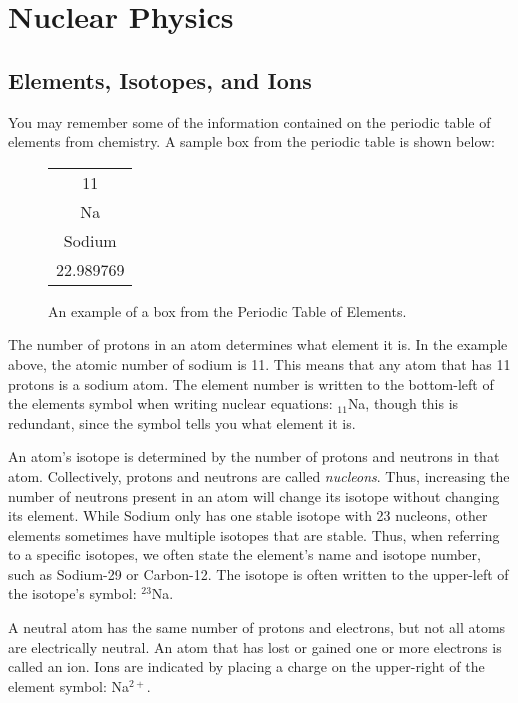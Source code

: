\chapter{Nuclear Physics}
\label{chap:nuclear}

\section{Elements, Isotopes, and Ions}    
You may remember some of the information contained on the periodic table of elements from chemistry.  A sample box from the periodic table is shown below: 

\begin{figure}[h]
	\begin{center}
	\begin{tabular}{|c| }
		\hline
		\color{red}11\color{black}\\
		\huge{Na}\\
		Sodium\\
		\color{blue}22.989769\color{black}\\
		\hline
	\end{tabular}
\caption{An example of a box from the Periodic Table of Elements.}
	\end{center}
\end{figure}

The number of protons in an atom determines what \gls{element} it is.  In the example above, the atomic number of sodium is \color{red}11\color{black}.  This means that any atom that has 11 protons is a sodium atom.  The element number is written to the bottom-left of the elements symbol when writing nuclear equations: $_{11}$Na, though this is redundant, since the symbol tells you what element it is.

An atom's \gls{isotope} is determined by the number of protons and neutrons in that atom.  Collectively, protons and neutrons are called \textit{nucleons}.  Thus, increasing the number of neutrons present in an atom will change its isotope without changing its element.  While Sodium only has one stable isotope with 23 nucleons, other elements sometimes have multiple isotopes that are stable.  Thus, when referring to a specific isotopes, we often state the element's name and isotope number, such as Sodium-29 or Carbon-12.  The isotope is often written to the upper-left of the isotope's symbol: $^{23}$Na.    

A neutral atom has the same number of protons and electrons, but not all atoms are electrically neutral.  An atom that has lost or gained one or more electrons is called an \gls{ion}.  Ions are indicated by placing a charge on the upper-right of the element symbol: Na$^{2+}$.

